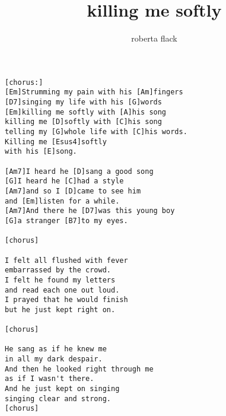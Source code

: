 \author{roberta flack}
\title{killing me softly}
\maketitle
\begin{verbatim}
[chorus:]
[Em]Strumming my pain with his [Am]fingers
[D7]singing my life with his [G]words
[Em]killing me softly with [A]his song
killing me [D]softly with [C]his song
telling my [G]whole life with [C]his words.
Killing me [Esus4]softly
with his [E]song.

[Am7]I heard he [D]sang a good song
[G]I heard he [C]had a style
[Am7]and so I [D]came to see him
and [Em]listen for a while.
[Am7]And there he [D7]was this young boy
[G]a stranger [B7]to my eyes.

[chorus]

I felt all flushed with fever
embarrassed by the crowd.
I felt he found my letters
and read each one out loud.
I prayed that he would finish
but he just kept right on.

[chorus]

He sang as if he knew me
in all my dark despair.
And then he looked right through me
as if I wasn't there.
And he just kept on singing
singing clear and strong.
[chorus]
\end{verbatim}